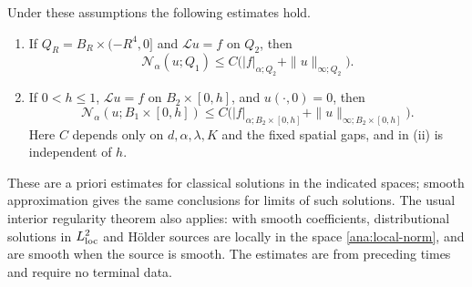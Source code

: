 \begin{lemma}\label{ana:schauder}
Under these assumptions the following estimates hold.
\begin{enumerate}[label=\textup{(\roman*)}]
\item If $Q_R=B_R\times(-R^4,0]$ and $\mathcal L u=f$ on $Q_2$, then
\begin{equation}\label{ana:interior-schauder}
 \mathcal N_\alpha(u;Q_1)
 \le C\bigl(|f|_{\alpha;Q_2}+\|u\|_{\infty;Q_2}\bigr).
\end{equation}
\item If $0<h\le1$, $\mathcal L u=f$ on $B_2\times[0,h]$, and
$u(\cdot,0)=0$, then
\begin{equation}\label{ana:initial-schauder}
 \mathcal N_\alpha(u;B_1\times[0,h])
 \le C\bigl(|f|_{\alpha;B_2\times[0,h]}
                   +\|u\|_{\infty;B_2\times[0,h]}\bigr).
\end{equation}
Here $C$ depends only on $d,\alpha,\lambda,K$ and the fixed spatial
gaps, and in \textup{(ii)} is independent of $h$.
\end{enumerate}
These are a priori estimates for classical solutions in the indicated
spaces; smooth approximation gives the same conclusions for limits
of such solutions.  The usual interior regularity theorem also
applies: with smooth coefficients, distributional solutions in
$L^2_{\rm loc}$ and H\"older sources are locally in the space
\eqref{ana:local-norm}, and are smooth when the source is smooth.
The estimates are from preceding times and require no terminal data.
\end{lemma}

